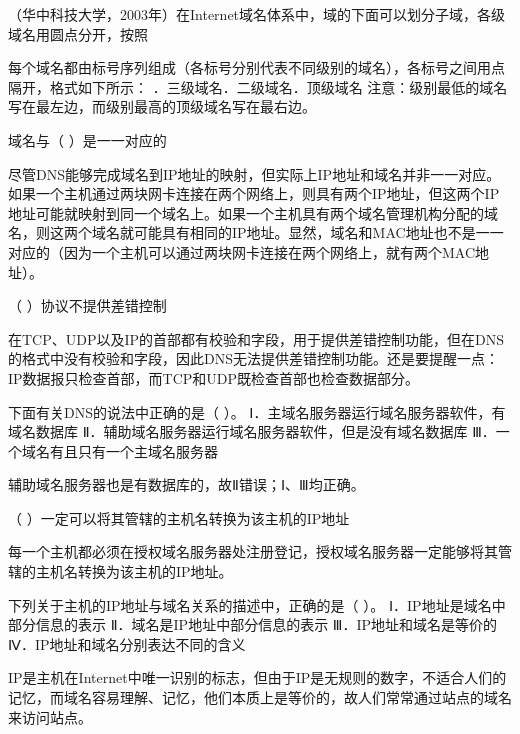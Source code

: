 \question （华中科技大学，2003年）在Internet域名体系中，域的下面可以划分子域，各级域名用圆点分开，按照
\par{}
\begin{solution}每个域名都由标号序列组成（各标号分别代表不同级别的域名），各标号之间用点隔开，格式如下所示：
．三级域名．二级域名．顶级域名
注意：级别最低的域名写在最左边，而级别最高的顶级域名写在最右边。
\end{solution}
\question 域名与（ ）是一一对应的
\par{}
\begin{solution}尽管DNS能够完成域名到IP地址的映射，但实际上IP地址和域名并非一一对应。如果一个主机通过两块网卡连接在两个网络上，则具有两个IP地址，但这两个IP地址可能就映射到同一个域名上。如果一个主机具有两个域名管理机构分配的域名，则这两个域名就可能具有相同的IP地址。显然，域名和MAC地址也不是一一对应的（因为一个主机可以通过两块网卡连接在两个网络上，就有两个MAC地址）。
\end{solution}
\question （ ）协议不提供差错控制
\par{}
\begin{solution}在TCP、UDP以及IP的首部都有校验和字段，用于提供差错控制功能，但在DNS的格式中没有校验和字段，因此DNS无法提供差错控制功能。还是要提醒一点：IP数据报只检查首部，而TCP和UDP既检查首部也检查数据部分。
\end{solution}
\question 下面有关DNS的说法中正确的是（ ）。
Ⅰ．主域名服务器运行域名服务器软件，有域名数据库
Ⅱ．辅助域名服务器运行域名服务器软件，但是没有域名数据库
Ⅲ．一个域名有且只有一个主域名服务器
\par{}
\begin{solution}辅助域名服务器也是有数据库的，故Ⅱ错误；Ⅰ、Ⅲ均正确。
\end{solution}
\question （ ）一定可以将其管辖的主机名转换为该主机的IP地址
\par{}
\begin{solution}每一个主机都必须在授权域名服务器处注册登记，授权域名服务器一定能够将其管辖的主机名转换为该主机的IP地址。
\end{solution}
\question 下列关于主机的IP地址与域名关系的描述中，正确的是（ ）。
Ⅰ．IP地址是域名中部分信息的表示 Ⅱ．域名是IP地址中部分信息的表示
Ⅲ．IP地址和域名是等价的 Ⅳ．IP地址和域名分别表达不同的含义
\par{}
\begin{solution}IP是主机在Internet中唯一识别的标志，但由于IP是无规则的数字，不适合人们的记忆，而域名容易理解、记忆，他们本质上是等价的，故人们常常通过站点的域名来访问站点。
\end{solution}
